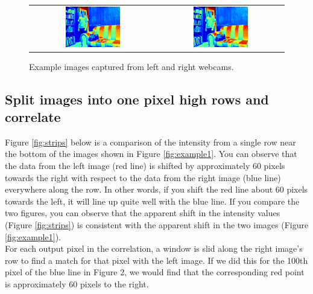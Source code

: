 \documentclass[11pt,fleqn]{article}
\begin{document}
\begin{figure}[!h]
\begin{mdframed}
\centering
\setlength{}
\begin{tabular}{cc}
\includegraphics[width=0.45\textwidth]{images/l.png} &
\includegraphics[width=0.45\textwidth]{images/r.png} \\[2pt]
\end{tabular}
\caption[Example images captured from webcams]{Example images captured from left and right webcams.}
\label{fig:image1}
\end{mdframed}
\end{figure}

\subsection{Split images into one pixel high rows and correlate}

Figure \ref{fig:strips} below is a comparison of the intensity from a single row near the bottom of the images shown in Figure \ref{fig:example1}. You can observe that the data from the left image (red line) is shifted by approximately 60 pixels towards the right with respect to the data from the right image (blue line) everywhere along the row. In other words, if you shift the red line about 60 pixels towards the left, it will line up quite well with the blue line. If you compare the two figures, you can observe that the apparent shift in the intensity values (Figure \ref{fig:strips}) is consistent with the apparent shift in the two images (Figure \ref{fig:example1}). \\[5pt]
%
For each output pixel in the correlation, a window is slid along the right image's row to find a match for that pixel with the left image. If we did this for the 100th pixel of the blue line in Figure 2, we would find that the corresponding red point is approximately 60 pixels to the right.\\
\end{document}
